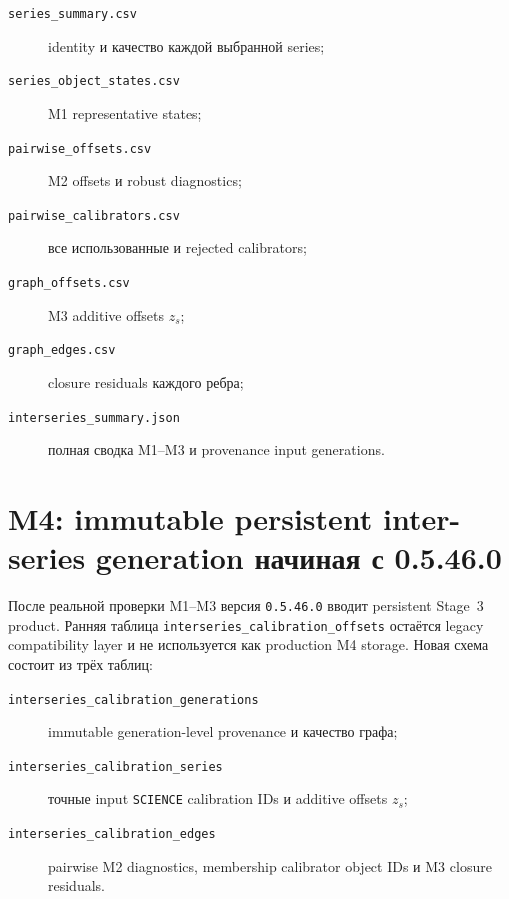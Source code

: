 \begin{description}
  \item[\texttt{series\_summary.csv}] identity и качество каждой выбранной series;
  \item[\texttt{series\_object\_states.csv}] M1 representative states;
  \item[\texttt{pairwise\_offsets.csv}] M2 offsets и robust diagnostics;
  \item[\texttt{pairwise\_calibrators.csv}] все использованные и rejected calibrators;
  \item[\texttt{graph\_offsets.csv}] M3 additive offsets $z_s$;
  \item[\texttt{graph\_edges.csv}] closure residuals каждого ребра;
  \item[\texttt{interseries\_summary.json}] полная сводка M1--M3 и provenance input generations.
\end{description}

\section{M4: immutable persistent inter-series generation начиная с 0.5.46.0}

После реальной проверки M1--M3 версия \texttt{0.5.46.0} вводит persistent Stage~3 product. Ранняя таблица \texttt{interseries\_calibration\_offsets} остаётся legacy compatibility layer и не используется как production M4 storage. Новая схема состоит из трёх таблиц:

\begin{description}
  \item[\texttt{interseries\_calibration\_generations}] immutable generation-level provenance и качество графа;
  \item[\texttt{interseries\_calibration\_series}] точные input \texttt{SCIENCE} calibration IDs и additive offsets $z_s$;
  \item[\texttt{interseries\_calibration\_edges}] pairwise M2 diagnostics, membership calibrator object IDs и M3 closure residuals.
\end{description}

